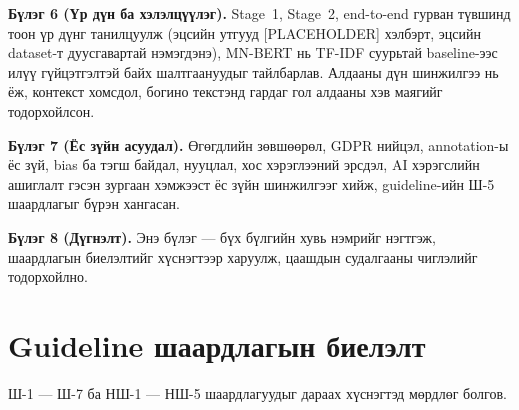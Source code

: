 \textbf{Бүлэг 6 (Үр дүн ба хэлэлцүүлэг).} Stage~1, Stage~2, end-to-end гурван
түвшинд тоон үр дүнг танилцуулж (эцсийн утгууд [PLACEHOLDER] хэлбэрт, эцсийн
dataset-т дуусгавартай нэмэгдэнэ), MN-BERT нь TF-IDF суурьтай baseline-ээс
илүү гүйцэтгэлтэй байх шалтгаануудыг тайлбарлав. Алдааны дүн шинжилгээ нь
ёж, контекст хомсдол, богино текстэнд гардаг гол алдааны хэв маягийг
тодорхойлсон.

\textbf{Бүлэг 7 (Ёс зүйн асуудал).} Өгөгдлийн зөвшөөрөл, GDPR нийцэл, annotation-ы
ёс зүй, bias ба тэгш байдал, нууцлал, хос хэрэглээний эрсдэл, AI хэрэгслийн
ашиглалт гэсэн зургаан хэмжээст ёс зүйн шинжилгээг хийж, guideline-ийн
Ш-5 шаардлагыг бүрэн хангасан.

\textbf{Бүлэг 8 (Дүгнэлт).} Энэ бүлэг --- бүх бүлгийн хувь нэмрийг нэгтгэж,
шаардлагын биелэлтийг хүснэгтээр харуулж, цаашдын судалгааны чиглэлийг
тодорхойлно.

\section{Guideline шаардлагын биелэлт}

Ш-1 --- Ш-7 ба НШ-1 --- НШ-5 шаардлагуудыг дараах хүснэгтэд мөрдлөг болгов.

